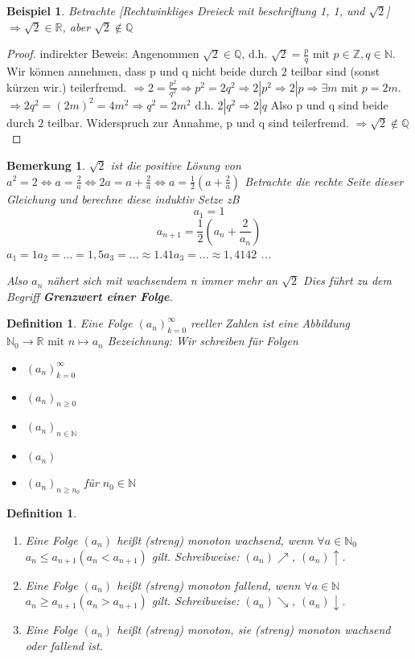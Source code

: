 \documentclass[a4paper,titlepage,oneside]{article}
\def\N{\ensuremath{\mathbb{N}} }
\def\Q{\ensuremath{\mathbb{Q}} }
\def\Z{\ensuremath{\mathbb{Z}} }
\def\R{\ensuremath{\mathbb{R}} }
\newcommand{\fain}[2]{\ensuremath{\forall#1\in#2}}
\theoremstyle{thmstyle}
\newtheorem{defi}[satz]{Definition}
\newtheorem{bsp}[satz]{Beispiel}
\newtheorem{bem}[satz]{Bemerkung}
\begin{document}
\begin{bsp}
Betrachte [Rechtwinkliges Dreieck mit beschriftung 1, 1, und $\sqrt{2}$]
\( \Rightarrow \sqrt{2} \in \R\), aber \(\sqrt{2} \not\in \Q\)
\end{bsp}
\begin{proof}
indirekter Beweis: Angenommen \(\sqrt{2} \in \Q\), d.h. 
$\sqrt{2} = \frac{p}{q}\text{ mit }p \in \Z, q \in \N.$
Wir können annehmen, dass p und q nicht beide durch $2$ teilbar sind (sonst kürzen wir.) teilerfremd.
\(\Rightarrow 2 = \frac{p^2}{q^2} \Rightarrow p^2 = 2q^2 \Rightarrow 2 | p^2 \Rightarrow 2 | p \Rightarrow \exists m \text{ mit } p = 2 m.\)
\( \Rightarrow 2q^2 = (2m)^2 = 4m^2 \Rightarrow q^2 = 2m^2 \text{ d.h. } 2 | q^2  \Rightarrow 2 | q \) Also p und q sind beide durch $2$ teilbar.  Widerspruch zur Annahme, p und q sind teilerfremd. $\Rightarrow \sqrt{2} \not\in \Q$
\end{proof}

\begin{bem}
\( \sqrt{2} \) ist die positive Lösung von \(a^2 = 2 \Leftrightarrow a = \frac{2}{a} \Leftrightarrow  2a = a + \frac{2}{a} \Leftrightarrow a= \frac{1}{2}\left(a + \frac{2}{a}\right)\)
Betrachte die rechte Seite dieser Gleichung und berechne diese induktiv
Setze zB \[a_1 = 1 \] \[a_{n+1} = \frac{1}{2}\left(a_n + \frac{2}{a_n}\right)\]
\(a_1 = 1
a_2 = ... = 1,5
a_3 = ... \approx 1.41
a_3 = ... \approx 1,4142\)
...

Also $a_n$ nähert sich mit wachsendem n immer mehr an $\sqrt{2}$
Dies führt zu dem Begriff \textbf{Grenzwert einer Folge}.
\end{bem}

\begin{defi}
Eine Folge $(a_n)_{k=0}^{\infty}$ reeller Zahlen ist eine Abbildung $\N_0 \rightarrow \R\text{ mit } n \mapsto a_n$ 
Bezeichnung: Wir schreiben für Folgen
\begin{itemize}
\item $(a_n)_{k=0}^{\infty}$
\item $(a_n)_{n\ge0}$
\item $(a_n)_{n\in\N}$
\item $(a_n)$
\item $(a_n)_{n\ge n_0}$ für $n_0 \in \N$
\end{itemize}
\end{defi}

\begin{defi}
\begin{enumerate}
\item Eine Folge $(a_n)$ heißt (streng) monoton wachsend, wenn \fain{a}{\N_0} $a_n \le a_{n+1} (a_n < a_{n+1})$ gilt. Schreibweise: $(a_n)\nearrow$, $(a_n)\uparrow$.
\item Eine Folge $(a_n)$ heißt (streng) monoton fallend, wenn \fain{a}{\N} $a_n \ge a_{n+1} (a_n > a_{n+1})$ gilt. Schreibweise: $(a_n)\searrow$, $(a_n)\downarrow$.
\item Eine Folge $(a_n)$ heißt (streng) monoton, sie (streng) monoton wachsend oder fallend ist.
\end{enumerate}
\end{defi}
\end{document}
